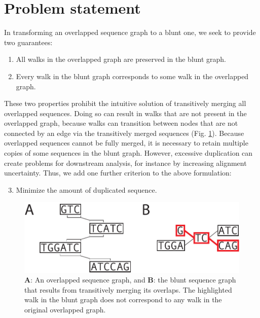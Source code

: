\documentclass[11pt]{ucthesis}
\newcommand{\figref}[1]{Fig. \ref{fig:#1}}
\begin{document}
\section{Problem statement}

In transforming an overlapped sequence graph to a blunt one, we seek to provide two guarantees:
\begin{enumerate}
    \item All walks in the overlapped graph are preserved in the blunt graph.
    \item Every walk in the blunt graph corresponds to some walk in the overlapped graph.
\end{enumerate}
These two properties prohibit the intuitive solution of transitively merging all overlapped sequences.
Doing so can result in walks that are not present in the overlapped graph, because walks can transition between nodes that are not connected by an edge via the transitively merged sequences (\figref{transitive}).
Because overlapped sequences cannot be fully merged, it is necessary to retain multiple copies of some sequences in the blunt graph.
However, excessive duplication can create problems for downstream analysis, for instance by increasing alignment uncertainty.
Thus, we add one further criterion to the above formulation:
\begin{enumerate}
  \setcounter{enumi}{2}
  \item Minimize the amount of duplicated sequence.
\end{enumerate}

\begin{figure}
\begin{center}
\includegraphics[width=.8\textwidth]{bluntfigures/transitive_collapse.pdf}
\caption{\textbf{A}: An overlapped sequence graph, and \textbf{B}: the blunt sequence graph that results from transitively merging its overlaps. The highlighted walk in the blunt graph does not correspond to any walk in the original overlapped graph.} \label{fig:transitive}
\end{center}
\end{figure}
\end{document}
